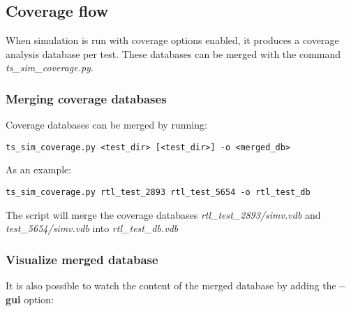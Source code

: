 \documentclass{tropic_design_spec}
\begin{document}
\subsection{Coverage flow}
\label{sec:coverage-flow}

When simulation is run with coverage options enabled, it produces a coverage analysis
database per test. These databases can be merged with the command \textit{ts_sim_coverage.py}.


\subsubsection{Merging coverage databases}
\label{sec:merging-coverage-databases}

Coverage databases can be merged by running:

\begin{lstlisting}
ts_sim_coverage.py <test_dir> [<test_dir>] -o <merged_db>
\end{lstlisting}

As an example:

\begin{lstlisting}
ts_sim_coverage.py rtl_test_2893 rtl_test_5654 -o rtl_test_db
\end{lstlisting}

The script will merge the coverage databases \textit{rtl_test_2893/simv.vdb} and
\textit{test_5654/simv.vdb} into \textit{rtl_test_db.vdb}




\subsubsection{Visualize merged database}
\label{sec:visualize-merged-database}

It is also possible to watch the content of  the merged database by adding
the \textbf{--gui} option:
\end{document}
